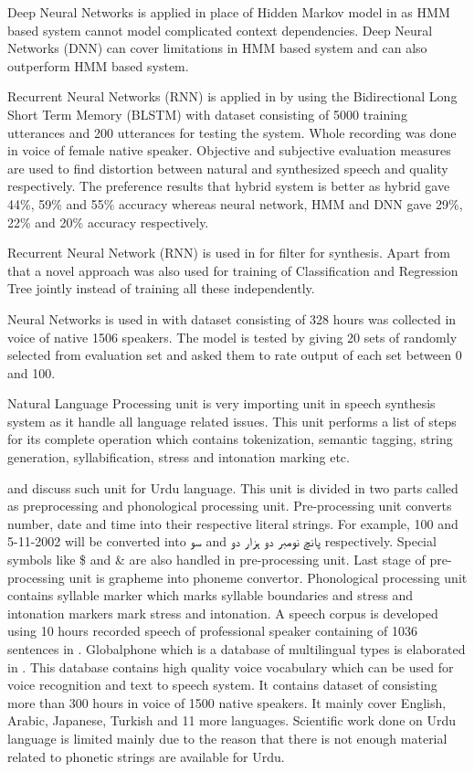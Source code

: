 Deep Neural Networks is applied in place of Hidden Markov model in \cite{ze2013statistical} as HMM
based system cannot model complicated context dependencies. Deep Neural Networks (DNN) can
cover limitations in HMM based system and can also outperform HMM based system. 

Recurrent Neural Networks (RNN) is applied in \cite{fan2014tts} by using the Bidirectional Long
Short Term Memory (BLSTM) with dataset consisting of 5000 training utterances and 200
utterances for testing the system. Whole recording was done in voice of female native speaker.
Objective and subjective evaluation measures are used to find distortion between natural and
synthesized speech and quality respectively. The preference results that hybrid system is better as
hybrid gave 44\%, 59\% and 55\% accuracy whereas neural network, HMM and DNN gave 29\%,
22\% and 20\% accuracy respectively.


Recurrent Neural Network (RNN) is used in \cite{muthukumar2016recurrent} for filter for
synthesis. Apart from that a novel approach was also used for training of Classification and
Regression Tree jointly instead of training all these independently.


Neural Networks is used in \cite{wu2016merlin} with dataset consisting of 328 hours was collected in
voice of native 1506 speakers. The model is tested by giving 20 sets of randomly selected from
evaluation set and asked them to rate output of each set between 0 and 100.

Natural Language Processing unit is very importing unit in speech synthesis system as it handle all language related issues.
This unit performs a list of steps for its complete operation which contains tokenization, semantic tagging, string generation,
syllabification, stress and intonation marking etc. 

\cite{saleem2002urdu} and \cite{urdu_text_preprocessing} discuss such unit for Urdu language. This unit is divided in two parts called as preprocessing and phonological processing unit. Pre-processing unit converts number, date and time into their respective literal strings. For example, 100 and 5-11-2002 will be converted into \texturdu{سو} and \texturdu{پانچ نومبر دو ہزار دو} respectively. Special symbols like \$ and & are also handled in pre-processing unit. Last stage of pre-processing unit is grapheme into phoneme convertor. Phonological processing unit contains syllable marker which marks syllable boundaries and stress and
intonation markers mark stress and intonation. A speech corpus is developed using 10 hours recorded speech of professional speaker containing of 1036 sentences in \cite{mumtaz2016break}. Globalphone which is a database of multilingual types is elaborated in \cite{schultz2002globalphone}. This
database contains high quality voice vocabulary which can be used for voice recognition and text to speech system. It
contains dataset of consisting more than 300 hours in voice of 1500 native speakers. It mainly cover English, Arabic,
Japanese, Turkish and 11 more languages. Scientific work done on Urdu language is limited mainly due to the reason that
there is not enough material related to phonetic strings are available for Urdu. 

